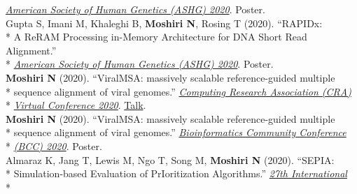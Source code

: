 \documentclass[margin,line]{res}
\begin{document}
\begin{resume}
\hspace*{7mm} \href{https://www.ashg.org/meetings/2020meeting}{\textit{American Society of Human Genetics (ASHG) 2020}}. Poster.\\
\hspace*{4mm} Gupta S, Imani M, Khaleghi B, \textbf{Moshiri N}, Rosing T (2020). ``RAPIDx:\\*
\hspace*{9.5mm} A ReRAM Processing in-Memory Architecture for DNA Short Read Alignment.''\\*\vspace{2mm}
\hspace*{7mm} \href{https://www.ashg.org/meetings/2020meeting}{\textit{American Society of Human Genetics (ASHG) 2020}}. Poster.\\
\hspace*{4mm} \textbf{Moshiri N} (2020). ``ViralMSA: massively scalable reference-guided multiple\\*
\hspace*{9.5mm} sequence alignment of viral genomes.'' \href{https://cra.org/events/cra-virtual-conference-2020/}{\textit{Computing Research Association (CRA)}}\\*\vspace{2mm}
\hspace*{8mm} \href{https://cra.org/events/cra-virtual-conference-2020/}{\textit{Virtual Conference 2020}}. \href{https://www.youtube.com/watch?v=PrAoks7OhE8&list=PL6AeXx75lHyyqKgfRmlSM4QUEna0dWDza&index=9&t=0s}{Talk}.\\
\hspace*{4mm} \textbf{Moshiri N} (2020). ``ViralMSA: massively scalable reference-guided multiple\\*
\hspace*{9.5mm} sequence alignment of viral genomes.'' \href{https://bcc2020.github.io/}{\textit{Bioinformatics Community Conference}}\\*\vspace{2mm}
\hspace*{8mm} \href{https://bcc2020.github.io/}{\textit{(BCC) 2020}}. Poster.\\
\hspace*{4mm} Almaraz K, Jang T, Lewis M, Ngo T, Song M, \textbf{Moshiri N} (2020). ``SEPIA:\\*
\hspace*{9.5mm} Simulation-based Evaluation of PrIoritization Algorithms.'' \href{https://cme.ucsd.edu/hivdynamics/}{\textit{27th International}}\\*\vspace{2mm}

\end{resume}
\end{document}
